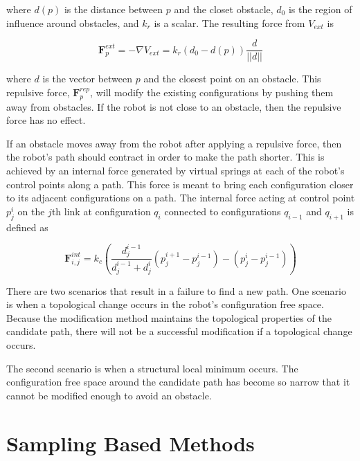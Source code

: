 \documentclass[10pt,conference]{ieeeconf}
\begin{document}
where $d(p)$ is the distance between $p$ and the closet obstacle, $d_0$ is the region of influence around obstacles, and $k_r$ is a scalar. The resulting force from $V_{ext}$ is

\begin{equation}
\textbf{F}^{ext}_p = -\nabla V_{ext} = k_r(d_0-d(p))\frac{d}{||d||}
\end{equation}

where $d$ is the vector between $p$ and the closest point on an obstacle. This repulsive force, $\textbf{F}^{rep}_p$, will modify the existing configurations by pushing them away from obstacles. If the robot is not close to an obstacle, then the repulsive force has no effect.

If an obstacle moves away from the robot after applying a repulsive force, then the robot's path should contract in order to make the path shorter. This is achieved by an internal force generated by virtual springs at each of the robot's control points along a path. This force is meant to bring each configuration closer to its adjacent configurations on a path. The internal force acting at control point $p^i_j$ on the $j$th link at configuration $q_i$ connected to configurations $q_{i-1}$ and $q_{i+1}$ is defined as

\begin{equation}
\textbf{F}^{int}_{i,j} = k_c\left( \frac{d^{i-1}_j}{d^{i-1}_j+d^i_j} (p^{i+1}_j-p^{i-1}_j)-(p^i_j-p^{i-1}_j) \right)
\end{equation}



There are two scenarios that result in a failure to find a new path. One scenario is when a topological change occurs in the robot's configuration free space. Because the modification method maintains the topological properties of the candidate path, there will not be a successful modification if a topological change occurs.

The second scenario is when a structural local minimum occurs. The configuration free space around the candidate path has become so narrow that it cannot be modified enough to avoid an obstacle.


	
\section{Sampling Based Methods}
\end{document}
